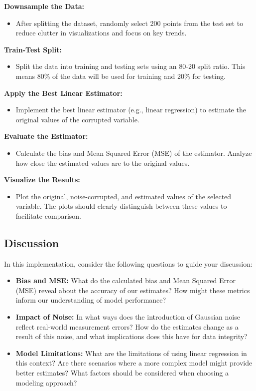 \documentclass{article}
\begin{document}
\textbf{Downsample the Data:}
\begin{itemize}
    \item After splitting the dataset, randomly select 200 points from the test set to reduce clutter in visualizations and focus on key trends. 
\end{itemize}

\textbf{Train-Test Split:}
\begin{itemize}
    \item Split the data into training and testing sets using an 80-20 split ratio. This means 80\% of the data will be used for training and 20\% for testing.
\end{itemize}

\textbf{Apply the Best Linear Estimator:}
\begin{itemize}
    \item Implement the best linear estimator (e.g., linear regression) to estimate the original values of the corrupted variable.
\end{itemize}

\textbf{Evaluate the Estimator:}
\begin{itemize}
    \item Calculate the bias and Mean Squared Error (MSE) of the estimator. Analyze how close the estimated values are to the original values.
\end{itemize}

\textbf{Visualize the Results:}
\begin{itemize}
    \item Plot the original, noise-corrupted, and estimated values of the selected variable. The plots should clearly distinguish between these values to facilitate comparison.
\end{itemize}

\subsection*{Discussion}
In this implementation, consider the following questions to guide your discussion:

\begin{itemize}
    \item \textbf{Bias and MSE:} What do the calculated bias and Mean Squared Error (MSE) reveal about the accuracy of our estimates? How might these metrics inform our understanding of model performance?

    \item \textbf{Impact of Noise:} In what ways does the introduction of Gaussian noise reflect real-world measurement errors? How do the estimates change as a result of this noise, and what implications does this have for data integrity?

    \item \textbf{Model Limitations:} What are the limitations of using linear regression in this context? Are there scenarios where a more complex model might provide better estimates? What factors should be considered when choosing a modeling approach?
\end{itemize}
 
\end{document}
